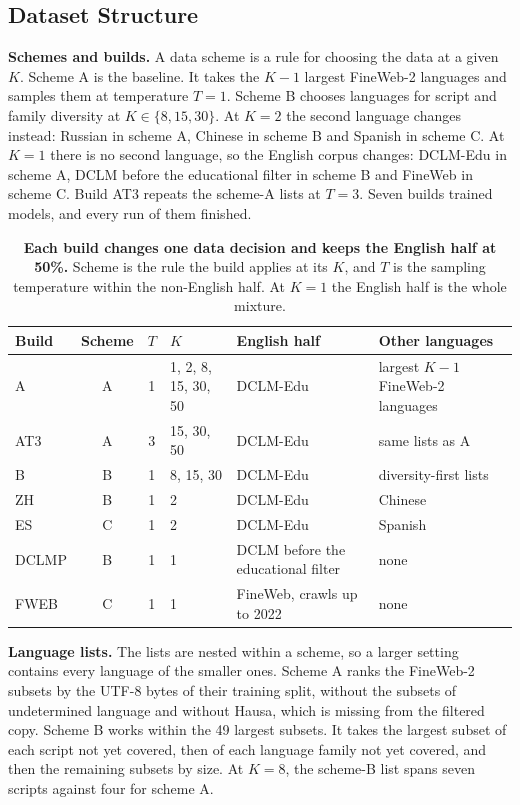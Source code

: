 \subsection*{Dataset Structure}

\textbf{Schemes and builds.} A data scheme is a rule for choosing the data at a given $K$. Scheme A is the baseline. It takes the $K-1$ largest FineWeb-2 languages and samples them at temperature $T=1$. Scheme B chooses languages for script and family diversity at $K \in \{8, 15, 30\}$. At $K=2$ the second language changes instead: Russian in scheme A, Chinese in scheme B and Spanish in scheme C. At $K=1$ there is no second language, so the English corpus changes: DCLM-Edu in scheme A, DCLM before the educational filter in scheme B and FineWeb in scheme C. Build AT3 repeats the scheme-A lists at $T=3$. Seven builds trained models, and every run of them finished.

\begin{table}[t]
\centering
\small
\setlength{\tabcolsep}{4pt}
\begin{tabular*}{\textwidth}{@{\extracolsep{\fill}}lcclll@{}}
\toprule
Build & Scheme & $T$ & $K$ & English half & Other languages \\
\midrule
A & A & 1 & 1, 2, 8, 15, 30, 50 & DCLM-Edu & largest $K-1$ FineWeb-2 languages \\
AT3 & A & 3 & 15, 30, 50 & DCLM-Edu & same lists as A \\
B & B & 1 & 8, 15, 30 & DCLM-Edu & diversity-first lists \\
ZH & B & 1 & 2 & DCLM-Edu & Chinese \\
ES & C & 1 & 2 & DCLM-Edu & Spanish \\
DCLMP & B & 1 & 1 & DCLM before the educational filter & none \\
FWEB & C & 1 & 1 & FineWeb, crawls up to 2022 & none \\
\bottomrule
\end{tabular*}
\caption{\textbf{Each build changes one data decision and keeps the English half at 50\%.} Scheme is the rule the build applies at its $K$, and $T$ is the sampling temperature within the non-English half. At $K=1$ the English half is the whole mixture.}
\label{tab:dcard-builds}
\end{table}

\textbf{Language lists.} The lists are nested within a scheme, so a larger setting contains every language of the smaller ones. Scheme A ranks the FineWeb-2 subsets by the UTF-8 bytes of their training split, without the subsets of undetermined language and without Hausa, which is missing from the filtered copy. Scheme B works within the 49 largest subsets. It takes the largest subset of each script not yet covered, then of each language family not yet covered, and then the remaining subsets by size. At $K=8$, the scheme-B list spans seven scripts against four for scheme A.

